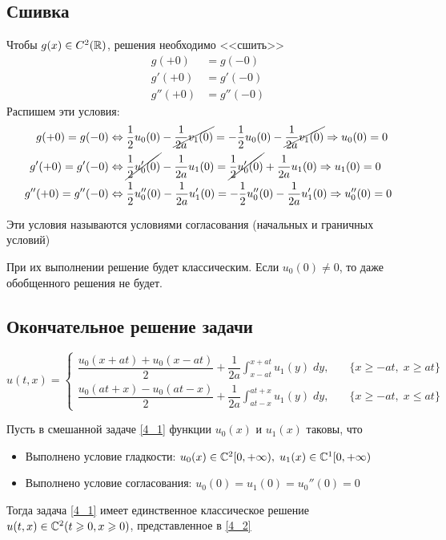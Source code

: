\documentclass[../main.tex]{subfiles}
\begin{document}
\subsection{Сшивка}
Чтобы $g(x) \in C^2(\mathbb{R})$, решения необходимо <<сшить>>
\begin{align*}
    g(+0) &= g(-0) \\
    g'(+0) &= g'(-0) \\
    g''(+0) &= g''(-0)
\end{align*}
Распишем эти условия:
\begin{align*}
     g(+0) = g(-0) &\Leftrightarrow 
    \frac{1}{2}u_0(0) - \cancel{\frac{1}{2a}v_1(0)} = -\frac{1}{2}u_0(0) - \cancel{\frac{1}{2a}v_1(0)} \Rightarrow u_0(0) = 0 \\
     g'(+0) = g'(-0) &\Leftrightarrow \cancel{\frac{1}{2}u'_0(0)} - \frac{1}{2a}u_1(0) =
    \cancel{\frac{1}{2}u'_0(0)} + \frac{1}{2a}u_1(0) \Rightarrow u_1(0) = 0 \\
     g''(+0) = g''(-0) &\Leftrightarrow \frac{1}{2} u''_0(0) - \frac{1}{2a} u_1'(0) = -\frac{1}{2}u_0''(0) - \frac{1}{2a} u_1'(0) \Rightarrow u_0''(0) = 0
\end{align*}

\begin{definition}
    Эти условия называются условиями согласования (начальных и граничных условий)
\end{definition}

При их выполнении решение будет классическим. Если $u_0(0) \ne 0$, то даже обобщенного решения не будет.

\subsection{Окончательное решение задачи}

\begin{equation} \label{4_2}
        u(t, x) = \begin{cases}
            \dfrac{u_0(x+at) + u_0(x-at)}{2} + \dfrac{1}{2a}\displaystyle\int_{x-at}^{x+at}u_1(y)\;dy,\quad & \{x\geq -at,\; x\geq at\} \\[0.8em]

            \dfrac{u_0(at+x) - u_0(at-x)}{2} + \dfrac{1}{2a}\displaystyle\int_{at-x}^{at+x}u_1(y)\;dy,\quad & \{x\geq -at,\; x\leq at\}
        \end{cases}
\end{equation}
\vspace{0pt}

\begin{theorem}
    Пусть в смешанной задаче \ref{4_1} функции $u_0(x)$ и $u_1(x)$ таковы, что 
    \begin{itemize}
        \item Выполнено условие гладкости: $u_0(x)\in \mathbb{C}^2[0, +\infty), \; u_1(x) \in \mathbb{C}^1[0, +\infty)$
        \item Выполнено условие согласования: $u_0(0) = u_1(0) = u_0''(0) = 0$
    \end{itemize}
    Тогда задача \ref{4_1} имеет единственное классическое решение $u(t,x) \in \mathbb{C}^2(t \geqslant 0, x\geqslant 0)$, представленное в \ref{4_2}
\end{theorem}
\end{document}
